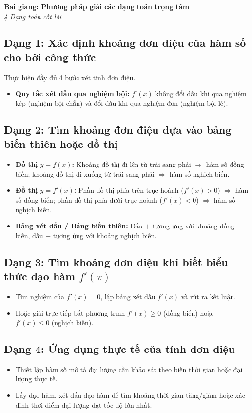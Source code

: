 \documentclass[12pt,a4paper]{article}
\newenvironment{lesson}[2]{\vspace{1em}\noindent\textbf{\Large Bai giang: #1}\\\textit{#2}\par}{}
\begin{document}
\begin{lesson}{Phương pháp giải các dạng toán trọng tâm}{4 Dạng toán cốt lõi}
\subsection{Dạng 1: Xác định khoảng đơn điệu của hàm số cho bởi công thức}
Thực hiện đầy đủ 4 bước xét tính đơn điệu.
\begin{itemize}
    \item \textbf{Quy tắc xét dấu qua nghiệm bội:} $f'(x)$ không đổi dấu khi qua nghiệm kép (nghiệm bội chẵn) và đổi dấu khi qua nghiệm đơn (nghiệm bội lẻ).
\end{itemize}

\subsection{Dạng 2: Tìm khoảng đơn điệu dựa vào bảng biến thiên hoặc đồ thị}
\begin{itemize}
    \item \textbf{Đồ thị $y = f(x)$:} Khoảng đồ thị đi lên từ trái sang phải $\Rightarrow$ hàm số đồng biến; khoảng đồ thị đi xuống từ trái sang phải $\Rightarrow$ hàm số nghịch biến.
    \item \textbf{Đồ thị $y = f'(x)$:} Phần đồ thị phía trên trục hoành ($f'(x) > 0$) $\Rightarrow$ hàm số đồng biến; phần đồ thị phía dưới trục hoành ($f'(x) < 0$) $\Rightarrow$ hàm số nghịch biến.
    \item \textbf{Bảng xét dấu / Bảng biến thiên:} Dấu $+$ tương ứng với khoảng đồng biến, dấu $-$ tương ứng với khoảng nghịch biến.
\end{itemize}

\subsection{Dạng 3: Tìm khoảng đơn điệu khi biết biểu thức đạo hàm $f'(x)$}
\begin{itemize}
    \item Tìm nghiệm của $f'(x) = 0$, lập bảng xét dấu $f'(x)$ và rút ra kết luận.
    \item Hoặc giải trực tiếp bất phương trình $f'(x) \ge 0$ (đồng biến) hoặc $f'(x) \le 0$ (nghịch biến).
\end{itemize}

\subsection{Dạng 4: Ứng dụng thực tế của tính đơn điệu}
\begin{itemize}
    \item Thiết lập hàm số mô tả đại lượng cần khảo sát theo biến thời gian hoặc đại lượng thực tế.
    \item Lấy đạo hàm, xét dấu đạo hàm để tìm khoảng thời gian tăng/giảm hoặc xác định thời điểm đại lượng đạt tốc độ lớn nhất.
\end{itemize}
\end{lesson}
\end{document}
